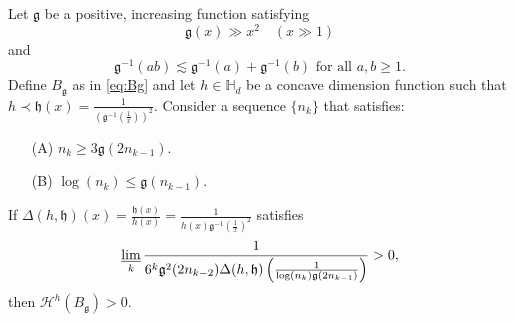 \documentclass[11pt,a4paper]{amsart}
\begin{document}
\begin{proposition}\label{pro:Bglow}
Let ${\mathfrak{g}}$ be a positive, increasing function satisfying 
\begin{equation}\label{eq:fastg} 
{\mathfrak{g}}(x)\gg x^2 \quad  (x\gg 1)
\end{equation}
and 
\begin{equation}\label{eq:logg-1}
{\mathfrak{g}}^{-1}(ab)\lesssim {\mathfrak{g}}^{-1}(a)+{\mathfrak{g}}^{-1}(b) \text{ for all }
a,b\ge1.
\end{equation}
Define $B_{\mathfrak{g}}$ as in \eqref{eq:Bg} and let $h\in{\mathbb{H}}_d$ be a concave dimension function
such that $h\prec{\mathfrak{h}}(x)=\frac{1}{\left({\mathfrak{g}}^{-1}(\frac{1}{x})\right)^2}$. Consider a sequence $\{n_k\}$ that satisfies:
\begin{itemize}
\item[(A)] $n_{k}\ge 3{\mathfrak{g}}(2n_{k-1})$.
\item[(B)] $\log(n_k)\le {\mathfrak{g}}(n_{k-1})$.
\end{itemize}
If
$\Delta(h,{\mathfrak{h}})(x)=\frac{{\mathfrak{h}}(x)}{h(x)}=\frac{1}{h(x){\mathfrak{g}}^{-1}(\frac{1}{x})^2}$
satisfies
\begin{equation}\label{eq:critlow}
\varliminf_k\frac{1}{6^k{\mathfrak{g}}^{2}(2n_{k-2})\Delta(h,{\mathfrak{h}})\left(\frac{1}{\log(n_{k}){\mathfrak{g}}(2n_{k-1})}\right)}>0,
\end{equation}
then ${\mathcal{H}^{{h}}}(B_{\mathfrak{g}})>0$.
\end{proposition}
\end{document}
